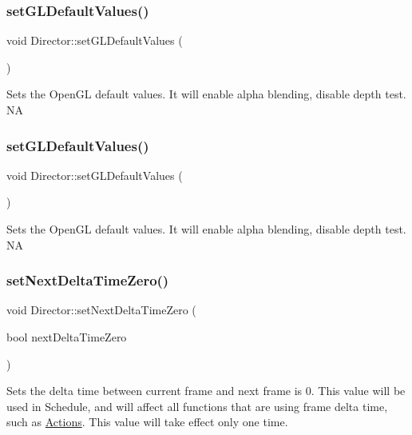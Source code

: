 \subsubsection{\texorpdfstring{set\+G\+L\+Default\+Values()}{setGLDefaultValues()}\hspace{0.1cm}{\footnotesize\ttfamily [1/2]}}
{\footnotesize\ttfamily void Director\+::set\+G\+L\+Default\+Values (\begin{DoxyParamCaption}{ }\end{DoxyParamCaption})}

Sets the Open\+GL default values. It will enable alpha blending, disable depth test.  NA \mbox{\label{classDirector_a7271f672c2afb904023fe0510fbe215f}} 
\subsubsection{\texorpdfstring{set\+G\+L\+Default\+Values()}{setGLDefaultValues()}\hspace{0.1cm}{\footnotesize\ttfamily [2/2]}}
{\footnotesize\ttfamily void Director\+::set\+G\+L\+Default\+Values (\begin{DoxyParamCaption}{ }\end{DoxyParamCaption})}

Sets the Open\+GL default values. It will enable alpha blending, disable depth test.  NA \mbox{\label{classDirector_a809b5dca9ab9d0896d2a9e201e2177ae}} 
\subsubsection{\texorpdfstring{set\+Next\+Delta\+Time\+Zero()}{setNextDeltaTimeZero()}\hspace{0.1cm}{\footnotesize\ttfamily [1/2]}}
{\footnotesize\ttfamily void Director\+::set\+Next\+Delta\+Time\+Zero (\begin{DoxyParamCaption}\item[{bool}]{next\+Delta\+Time\+Zero }\end{DoxyParamCaption})}

Sets the delta time between current frame and next frame is 0. This value will be used in Schedule, and will affect all functions that are using frame delta time, such as \hyperlink{classActions}{Actions}. This value will take effect only one time. \mbox{\label{classDirector_a809b5dca9ab9d0896d2a9e201e2177ae}} 
